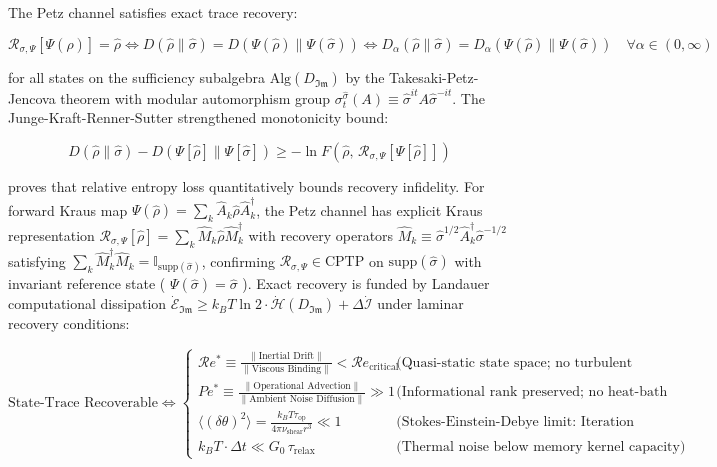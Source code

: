 \documentclass[11pt,a4paper]{article}
\theoremstyle{definition}\newtheorem{definition}{Definition}
\theoremstyle{remark}\newtheorem{remark}{Remark}
\begin{document}
The Petz channel satisfies exact trace recovery:


\begin{equation}
\mathcal{R}_{\sigma, \Psi}[\Psi(\hat{\rho})] = \hat{\rho} \iff D(\hat{\rho} \parallel \hat{\sigma}) = D(\Psi(\hat{\rho}) \parallel \Psi(\hat{\sigma})) \iff D_\alpha(\hat{\rho} \parallel \hat{\sigma}) = D_\alpha(\Psi(\hat{\rho}) \parallel \Psi(\hat{\sigma})) \quad \forall \alpha \in (0, \infty)
\end{equation}


for all states on the sufficiency subalgebra $\mathrm{Alg}(D_{\mathfrak{Im}})$ by the Takesaki-Petz-Jencova theorem with modular automorphism group $\sigma_t^{\hat{\sigma}}(A) \equiv \hat{\sigma}^{it} A \hat{\sigma}^{-it}$. The Junge-Kraft-Renner-Sutter strengthened monotonicity bound:


\begin{equation}
D(\hat{\rho} \parallel \hat{\sigma}) - D(\Psi[\hat{\rho}] \parallel \Psi[\hat{\sigma}]) \ge -\ln F\left(\hat{\rho}, \, \mathcal{R}_{\sigma, \Psi}[\Psi[\hat{\rho}]]\right)
\end{equation}


proves that relative entropy loss quantitatively bounds recovery infidelity. For forward Kraus map $\Psi(\hat{\rho}) = \sum_k \hat{A}_k \hat{\rho} \hat{A}_k^\dagger$, the Petz channel has explicit Kraus representation $\mathcal{R}_{\sigma, \Psi}[\hat{\rho}] = \sum_k \hat{M}_k \hat{\rho} \hat{M}_k^\dagger$ with recovery operators $\hat{M}_k \equiv \hat{\sigma}^{1/2} \hat{A}_k^\dagger \hat{\sigma}^{-1/2}$ satisfying $\sum_k \hat{M}_k^\dagger \hat{M}_k = \mathbb{I}_{\mathrm{supp}(\hat{\sigma})}$, confirming $\mathcal{R}_{\sigma, \Psi} \in \mathrm{CPTP}$ on $\mathrm{supp}(\hat{\sigma})$ with invariant reference state ( $\Psi(\hat{\sigma}) = \hat{\sigma}$ ). Exact recovery is funded by Landauer computational dissipation $\dot{\mathcal{E}}_{\mathfrak{Im}} \ge k_B T \ln 2 \cdot \dot{\mathcal{H}}(D_{\mathfrak{Im}}) + \Delta \dot{\mathcal{I}}$ under laminar recovery conditions:


\begin{equation}
\text{State-Trace Recoverable} \iff \begin{cases}
\mathcal{R}e^* \equiv \frac{\|\text{Inertial Drift}\|}{\|\text{Viscous Binding}\|} < \mathcal{R}e_{\text{critical}} & \text{(Quasi-static state space; no turbulent scrambling)} \\
Pe^* \equiv \frac{\|\text{Operational Advection}\|}{\|\text{Ambient Noise Diffusion}\|} \gg 1 & \text{(Informational rank preserved; no heat-bath bleed)} \\
\langle(\delta\theta)^2\rangle = \frac{k_B T \tau_{\text{op}}}{4 \pi \nu_{\text{shear}} r^3} \ll 1 & \text{(Stokes-Einstein-Debye limit: Iteration outpaces thermal decoherence)} \\
k_B T \cdot \Delta t \ll G_0 \, \tau_{\text{relax}} & \text{(Thermal noise below memory kernel capacity)}
\end{cases}
\end{equation}
\end{document}

